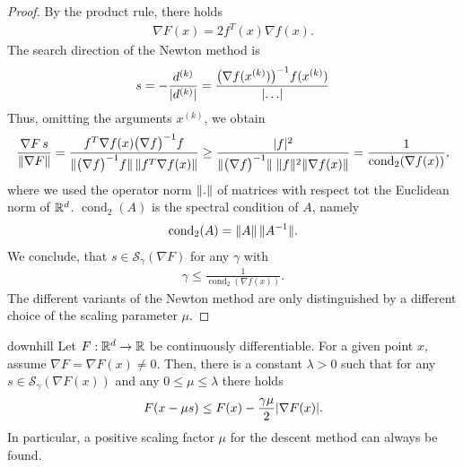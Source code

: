 \begin{proof}
  By the product rule, there holds
  \begin{gather*}
    \nabla F(x) = 2 f^T(x) \nabla f(x).
  \end{gather*}
  The search direction of the Newton method is
  \begin{gather*}
    s = -\frac{d^{(k)}}{\lvert d^{(k)}\rvert}
    = \frac{\bigl(\nabla f(x^{(k)})\bigr)^{-1}f(x^{(k)})}{\lvert\dots\rvert}
  \end{gather*}
  Thus, omitting the arguments $x^{(k)}$, we obtain
  \begin{gather*}
    \frac{\nabla F\, s}{\norm{\nabla F}}
    = \frac{f^T \nabla f(x)\bigl(\nabla f\bigr)^{-1} f}%
    {\norm{\bigl(\nabla f\bigr)^{-1} f}\,\norm{f^T \nabla f(x)}}
    \ge \frac{\abs{f}^2}{\norm{\bigl(\nabla f\bigr)^{-1}}\;
      \norm{f}^2 \norm{\nabla f(x)} }
    = \frac1{\operatorname{cond}_2 (\nabla f(x))},
  \end{gather*}
  where we used the operator norm $\lVert.\rVert$ of matrices with respect
  tot the Euclidean norm of $\mathbb R^d$. $\operatorname{cond}_2(A)$ is the
  spectral condition of $A$, namely
  \begin{gather*}
    \operatorname{cond}_2(A) = \lVert A\rVert \, \lVert A^{-1}\rVert.
  \end{gather*}
  We conclude, that $s\in \mathcal S_\gamma(\nabla F)$ for any
  $\gamma$ with
  \begin{gather*}
    \gamma \le \frac1{\operatorname{cond}_2 (\nabla f(x))}.
  \end{gather*}
  The different variants of the Newton method are only distinguished by
  a different choice of the scaling parameter $\mu$.
\end{proof}

\begin{Lemma}{downhill}
  Let $F: \mathbb R^d \to \mathbb R$ be continuously differentiable. For a given
  point $x$, assume $\nabla F = \nabla F(x) \neq 0$.  Then, there is a
  constant $\lambda > 0$ such that for any
  $s\in \mathcal S_\gamma(\nabla F(x))$ and any
  $0 \le \mu \le \lambda$ there holds
  \begin{gather}
    \label{eq:downhill:1}
    F(x-\mu s) \le F(x) - \frac{\gamma\mu}2 \lvert\nabla F(x)\rvert.
  \end{gather}
  In particular, a positive scaling factor $\mu$ for the descent method can
  always be found.
\end{Lemma}

